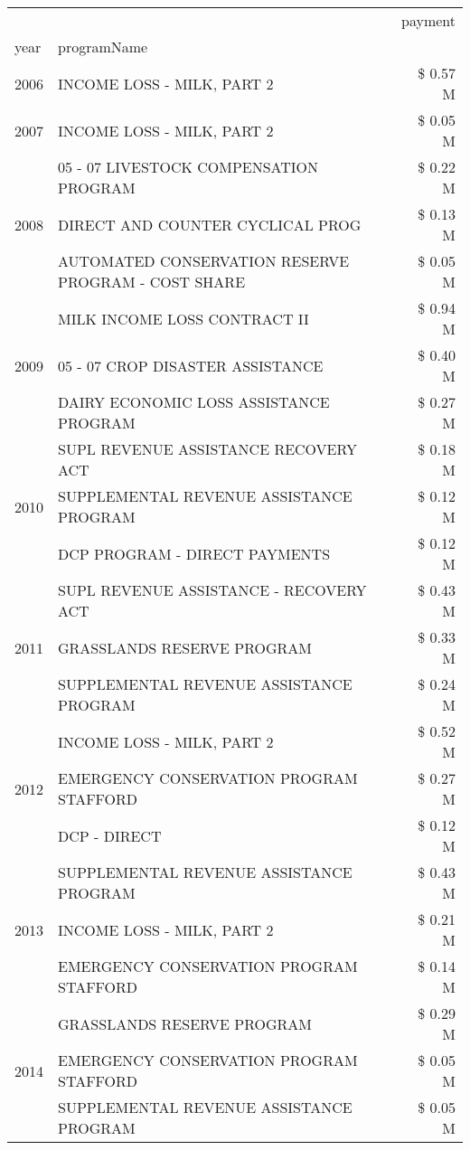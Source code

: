 \begin{tabular}{llr}
\toprule
 &  & payment \\
year & programName &  \\
\midrule
2006 & INCOME LOSS - MILK, PART 2 & \$ 0.57 M \\
\cline{1-3}
2007 & INCOME LOSS - MILK, PART 2 & \$ 0.05 M \\
\cline{1-3}
\multirow[t]{3}{*}{2008} & 05 - 07 LIVESTOCK COMPENSATION PROGRAM & \$ 0.22 M \\
 & DIRECT AND COUNTER CYCLICAL PROG & \$ 0.13 M \\
 & AUTOMATED CONSERVATION RESERVE PROGRAM - COST SHARE & \$ 0.05 M \\
\cline{1-3}
\multirow[t]{3}{*}{2009} & MILK INCOME LOSS CONTRACT II & \$ 0.94 M \\
 & 05 - 07 CROP DISASTER ASSISTANCE & \$ 0.40 M \\
 & DAIRY ECONOMIC LOSS ASSISTANCE PROGRAM & \$ 0.27 M \\
\cline{1-3}
\multirow[t]{3}{*}{2010} & SUPL REVENUE ASSISTANCE RECOVERY ACT & \$ 0.18 M \\
 & SUPPLEMENTAL REVENUE ASSISTANCE PROGRAM & \$ 0.12 M \\
 & DCP PROGRAM - DIRECT PAYMENTS & \$ 0.12 M \\
\cline{1-3}
\multirow[t]{3}{*}{2011} & SUPL REVENUE ASSISTANCE - RECOVERY ACT & \$ 0.43 M \\
 & GRASSLANDS RESERVE PROGRAM & \$ 0.33 M \\
 & SUPPLEMENTAL REVENUE ASSISTANCE PROGRAM & \$ 0.24 M \\
\cline{1-3}
\multirow[t]{3}{*}{2012} & INCOME LOSS - MILK, PART 2 & \$ 0.52 M \\
 & EMERGENCY CONSERVATION PROGRAM STAFFORD & \$ 0.27 M \\
 & DCP - DIRECT & \$ 0.12 M \\
\cline{1-3}
\multirow[t]{3}{*}{2013} & SUPPLEMENTAL REVENUE ASSISTANCE PROGRAM & \$ 0.43 M \\
 & INCOME LOSS - MILK, PART 2 & \$ 0.21 M \\
 & EMERGENCY CONSERVATION PROGRAM STAFFORD & \$ 0.14 M \\
\cline{1-3}
\multirow[t]{3}{*}{2014} & GRASSLANDS RESERVE PROGRAM & \$ 0.29 M \\
 & EMERGENCY CONSERVATION PROGRAM STAFFORD & \$ 0.05 M \\
 & SUPPLEMENTAL REVENUE ASSISTANCE PROGRAM & \$ 0.05 M \\
\cline{1-3}

\end{tabular}
